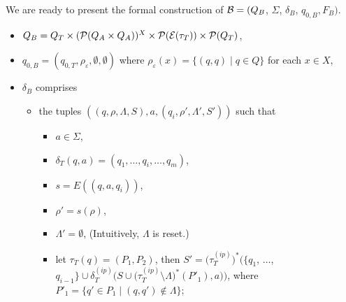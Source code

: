                     We are ready to present the formal construction of $\mathcal{B} =  (Q_B$, $\Sigma$, $\delta_B$, $q_{0, B}, F_B)$.
                    \begin{itemize}
                        \item $Q_B = Q_T \times (\mathcal{P}(Q_A \times Q_A ))^{X} \times \mathcal{P}(\mathcal{E}(\tau_T)) \times \mathcal{P}(Q_T)$,

                        \item $q_{0, B} = (q_{0,T}, \rho_{\varepsilon}, \emptyset, \emptyset)$ where $\rho_{\varepsilon} (x) = \{(q, q) \mid q \in Q\}$ for each $x \in X$,

                        \item $\delta_{B}$ comprises
                            \begin{itemize}
                                \item the tuples $((q, \rho, \Lambda, S), a, (q_i, \rho', \Lambda', S'))$ such that
                                    \begin{itemize}
                                        \item $a \in \Sigma$,
                                        \item $\delta_T (q, a) = (q_1, \ldots, q_i, \ldots, q_m)$,
                                        \item $s = E((q, a, q_i))$,
                                        \item $\rho' = s(\rho)$,
                                        \item $\Lambda' = \emptyset$, (Intuitively, $\Lambda$ is reset.)
                                        \item let $\tau_T(q) = (P_1, P_2)$, then $S' = \big(\tau^{(ip)}_T\big)^\ast\big(\{ q_1$, $\ldots$, $q_{i - 1} \} \cup \delta^{(ip)}_T\big(S \cup \big(\tau^{(ip)}_T \setminus \Lambda\big)^\ast(P'_1), a\big)\big)$, where $P'_1 = \{q' \in P_1 \mid (q, q') \not \in \Lambda\}$;

\end{itemize}
\end{itemize}
\end{itemize}
